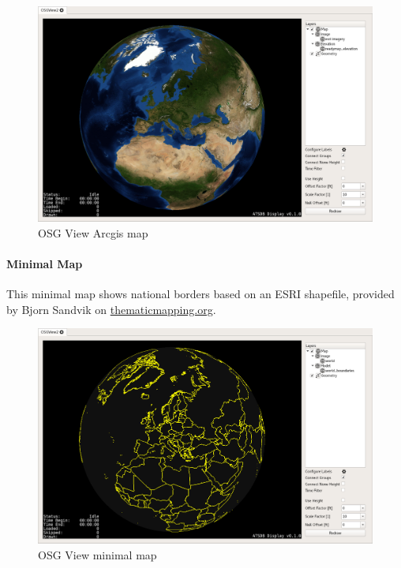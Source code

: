 {\begin{figure}[H]
    \hspace*{-2cm}
    \includegraphics[width=18cm,frame]{../screenshots/osgview_arcgis.png}
  \caption{OSG View Arcgis map}
\end{figure}

\newpage
\paragraph{Minimal Map}

This minimal map shows national borders based on an ESRI shapefile, provided by Bjorn Sandvik on \url{thematicmapping.org}.

\begin{figure}[H]
    \hspace*{-2cm}
    \includegraphics[width=18cm,frame]{../screenshots/osgview_minimal.png}
  \caption{OSG View minimal map}
\end{figure}

}
